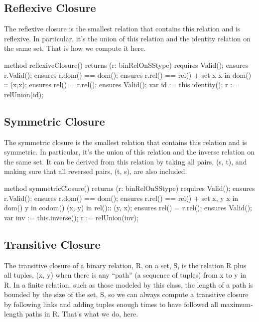 \documentclass[letterpaper,10pt,english]{sphinxmanual}
\begin{document}
\subsection{Reflexive Closure}
\label{\detokenize{08-relations:reflexive-closure}}
The reflexive closure is the smallest relation
that contains this relation and is reflexive. In
particular, it’s the union of this relation and
the identity relation on the same set. That is
how we compute it here.

\begin{sphinxVerbatim}[commandchars=\\\{\}]
method reflexiveClosure() returns (r: binRelOnS\PYGZlt{}Stype\PYGZgt{})
    requires Valid();
    ensures r.Valid();
    ensures r.dom() == dom();
    ensures r.rel() == rel() + set x \textbar{} x in dom() :: (x,x);
    ensures rel() \PYGZlt{}= r.rel();
    ensures Valid();
\PYGZob{}
    var id := this.identity();
    r := relUnion(id);
\PYGZcb{}
\end{sphinxVerbatim}


\subsection{Symmetric Closure}
\label{\detokenize{08-relations:symmetric-closure}}
The symmetric closure is the smallest relation that contains this
relation and is symmetric. In particular, it’s the union of this
relation and the inverse relation on the same set. It can be derived
from this relation by taking all pairs, (s, t), and making sure that
all reversed pairs, (t, s), are also included.

\begin{sphinxVerbatim}[commandchars=\\\{\}]
method symmetricClosure() returns (r: binRelOnS\PYGZlt{}Stype\PYGZgt{})
    requires Valid();
    ensures r.Valid();
    ensures r.dom() == dom();
    ensures r.rel() == rel() + set x, y \textbar{}
        x in dom() \PYGZam{}\PYGZam{} y in codom() \PYGZam{}\PYGZam{} (x, y) in rel():: (y, x);
    ensures rel() \PYGZlt{}= r.rel();
    ensures Valid();
\PYGZob{}
    var inv := this.inverse();
    r := relUnion(inv);
\PYGZcb{}
\end{sphinxVerbatim}


\subsection{Transitive Closure}
\label{\detokenize{08-relations:transitive-closure}}
The transitive closure of a binary relation, R, on a set, S, is the
relation R plus all tuples, (x, y) when there is any “path” (a
sequence of tuples) from x to y in R. In a finite relation.  such as
those modeled by this class, the length of a path is bounded by the
size of the set, S, so we can always compute a transitive closure by
following links and adding tuples enough times to have followed all
maximum-length paths in R.  That’s what we do, here.
\end{document}
